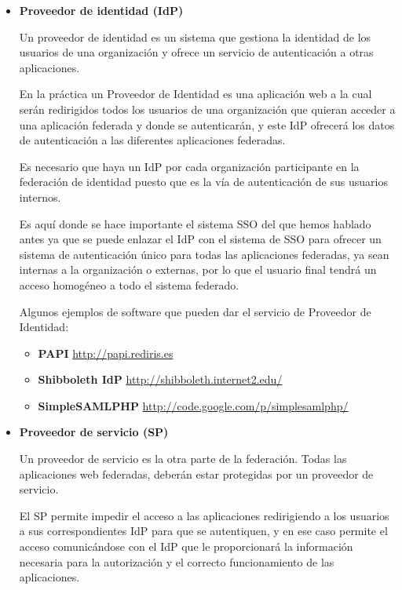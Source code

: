 \begin{itemize}
            \item \textbf{Proveedor de identidad (IdP)}

    Un proveedor de identidad es un sistema que gestiona la identidad
    de los usuarios de una organización y ofrece un servicio de
    autenticación a otras aplicaciones.

    En la práctica un Proveedor de Identidad es una aplicación web a
    la cual serán redirigidos todos los usuarios de una organización
    que quieran acceder a una aplicación federada y donde se
    autenticarán, y este IdP ofrecerá los datos de autenticación a las
    diferentes aplicaciones federadas.

    Es necesario que haya un IdP por cada organización participante en
    la federación de identidad puesto que es la vía de autenticación
    de sus usuarios internos.

    Es aquí donde se hace importante el sistema SSO del que hemos
    hablado antes ya que se puede enlazar el IdP con el sistema de
    SSO para ofrecer un sistema de autenticación único para todas las
    aplicaciones federadas, ya sean internas a la organización o
    externas, por lo que el usuario final tendrá un acceso homogéneo a
    todo el sistema federado.

    Algunos ejemplos de software que pueden dar el servicio de Proveedor
    de Identidad:
    \begin{itemize}
        \item \textbf{PAPI} \href{http://papi.rediris.es}{http://papi.rediris.es}
        \item \textbf{Shibboleth IdP} \href{http://shibboleth.internet2.edu/}{http://shibboleth.internet2.edu/}
        \item \textbf{SimpleSAMLPHP} \href{http://code.google.com/p/simplesamlphp/}{http://code.google.com/p/simplesamlphp/}
    \end{itemize}

            \item \textbf{Proveedor de servicio (SP)}

    Un proveedor de servicio es la otra parte de la federación. Todas
    las aplicaciones web federadas, deberán estar protegidas por un
    proveedor de servicio.

    El SP permite impedir el acceso a las aplicaciones redirigiendo a
    los usuarios a sus correspondientes IdP para que se autentiquen,
    y en ese caso permite el acceso comunicándose con el IdP que le
    proporcionará la información necesaria para la autorización y el
    correcto funcionamiento de las aplicaciones.


\end{itemize}
